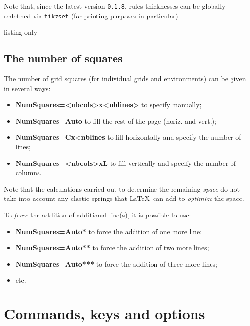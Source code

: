 \documentclass[a4paper]{article}
\newcommand\Cle[1]{{\bfseries\sffamily\textlangle #1\textrangle}}
\begin{document}
Note that, since the latest version \texttt{0.1.8}, rules thicknesses can be globally redefined via \texttt{tikzset} (for printing purposes in particular).

\begin{PresentationCode}{listing only}
\end{PresentationCode}
\subsection{The number of squares}

The number of grid squares (for individual grids and environments) can be given in several ways:

\begin{itemize}
	\item \Cle{NumSquares=<nbcols>x<nblines>} to specify manually;
	\item \Cle{NumSquares=Auto} to fill the rest of the page (horiz. and vert.);
	\item \Cle{NumSquares=Cx<nblines} to fill horizontally and specify the number of lines;
	\item \Cle{NumSquares=<nbcols>xL} to fill vertically and specify the number of columns.
\end{itemize}

Note that the calculations carried out to determine the remaining \textit{space} do not take into account any elastic springs that \LaTeX\ can add to \textit{optimize} the space.

\smallskip

To \textit{force} the addition of additional line(s), it is possible to use:

\begin{itemize}
	\item \Cle{NumSquares=Auto*} to force the addition of one more line;
	\item \Cle{NumSquares=Auto**} to force the addition of two more lines;
	\item \Cle{NumSquares=Auto***} to force the addition of three more lines;
	\item etc.
\end{itemize}

\pagebreak

\section{Commands, keys and options}
\end{document}
